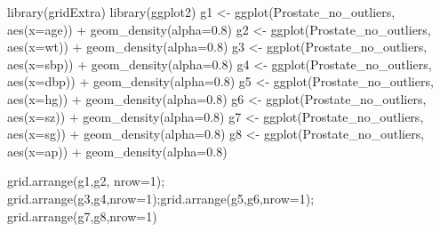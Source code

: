 \documentclass[
]{article}
\newenvironment{Shaded}{\begin{snugshade}}{\end{snugshade}}
\newcommand{\AttributeTok}[1]{\textcolor[rgb]{0.77,0.63,0.00}{#1}}
\newcommand{\DecValTok}[1]{\textcolor[rgb]{0.00,0.00,0.81}{#1}}
\newcommand{\FloatTok}[1]{\textcolor[rgb]{0.00,0.00,0.81}{#1}}
\newcommand{\FunctionTok}[1]{\textcolor[rgb]{0.00,0.00,0.00}{#1}}
\newcommand{\NormalTok}[1]{#1}
\newcommand{\OtherTok}[1]{\textcolor[rgb]{0.56,0.35,0.01}{#1}}
\newcommand{\SpecialCharTok}[1]{\textcolor[rgb]{0.00,0.00,0.00}{#1}}
\begin{document}
\begin{Shaded}
\begin{Highlighting}[]
\FunctionTok{library}\NormalTok{(gridExtra)}
\FunctionTok{library}\NormalTok{(ggplot2)}
\NormalTok{g1 }\OtherTok{\textless{}{-}} \FunctionTok{ggplot}\NormalTok{(Prostate\_no\_outliers, }\FunctionTok{aes}\NormalTok{(}\AttributeTok{x=}\NormalTok{age)) }\SpecialCharTok{+} \FunctionTok{geom\_density}\NormalTok{(}\AttributeTok{alpha=}\FloatTok{0.8}\NormalTok{)}
\NormalTok{g2 }\OtherTok{\textless{}{-}} \FunctionTok{ggplot}\NormalTok{(Prostate\_no\_outliers, }\FunctionTok{aes}\NormalTok{(}\AttributeTok{x=}\NormalTok{wt)) }\SpecialCharTok{+} \FunctionTok{geom\_density}\NormalTok{(}\AttributeTok{alpha=}\FloatTok{0.8}\NormalTok{)}
\NormalTok{g3 }\OtherTok{\textless{}{-}} \FunctionTok{ggplot}\NormalTok{(Prostate\_no\_outliers, }\FunctionTok{aes}\NormalTok{(}\AttributeTok{x=}\NormalTok{sbp)) }\SpecialCharTok{+} \FunctionTok{geom\_density}\NormalTok{(}\AttributeTok{alpha=}\FloatTok{0.8}\NormalTok{)}
\NormalTok{g4 }\OtherTok{\textless{}{-}} \FunctionTok{ggplot}\NormalTok{(Prostate\_no\_outliers, }\FunctionTok{aes}\NormalTok{(}\AttributeTok{x=}\NormalTok{dbp)) }\SpecialCharTok{+} \FunctionTok{geom\_density}\NormalTok{(}\AttributeTok{alpha=}\FloatTok{0.8}\NormalTok{)}
\NormalTok{g5 }\OtherTok{\textless{}{-}} \FunctionTok{ggplot}\NormalTok{(Prostate\_no\_outliers, }\FunctionTok{aes}\NormalTok{(}\AttributeTok{x=}\NormalTok{hg)) }\SpecialCharTok{+} \FunctionTok{geom\_density}\NormalTok{(}\AttributeTok{alpha=}\FloatTok{0.8}\NormalTok{)}
\NormalTok{g6 }\OtherTok{\textless{}{-}} \FunctionTok{ggplot}\NormalTok{(Prostate\_no\_outliers, }\FunctionTok{aes}\NormalTok{(}\AttributeTok{x=}\NormalTok{sz)) }\SpecialCharTok{+} \FunctionTok{geom\_density}\NormalTok{(}\AttributeTok{alpha=}\FloatTok{0.8}\NormalTok{)}
\NormalTok{g7 }\OtherTok{\textless{}{-}} \FunctionTok{ggplot}\NormalTok{(Prostate\_no\_outliers, }\FunctionTok{aes}\NormalTok{(}\AttributeTok{x=}\NormalTok{sg)) }\SpecialCharTok{+} \FunctionTok{geom\_density}\NormalTok{(}\AttributeTok{alpha=}\FloatTok{0.8}\NormalTok{)}
\NormalTok{g8 }\OtherTok{\textless{}{-}} \FunctionTok{ggplot}\NormalTok{(Prostate\_no\_outliers, }\FunctionTok{aes}\NormalTok{(}\AttributeTok{x=}\NormalTok{ap)) }\SpecialCharTok{+} \FunctionTok{geom\_density}\NormalTok{(}\AttributeTok{alpha=}\FloatTok{0.8}\NormalTok{)}

\FunctionTok{grid.arrange}\NormalTok{(g1,g2, }\AttributeTok{nrow=}\DecValTok{1}\NormalTok{); }\FunctionTok{grid.arrange}\NormalTok{(g3,g4,}\AttributeTok{nrow=}\DecValTok{1}\NormalTok{);}\FunctionTok{grid.arrange}\NormalTok{(g5,g6,}\AttributeTok{nrow=}\DecValTok{1}\NormalTok{); }\FunctionTok{grid.arrange}\NormalTok{(g7,g8,}\AttributeTok{nrow=}\DecValTok{1}\NormalTok{)}
\end{Highlighting}
\end{Shaded}
\end{document}
